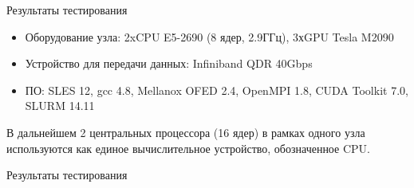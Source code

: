 \documentclass{beamer}
\begin{document}
\begin{frame}{Результаты тестирования}
	\begin{itemize}
		\item Оборудование узла: 2xCPU E5-2690 (8 ядер, 2.9ГГц), 3хGPU Tesla M2090 
		
		\vspace{0.7cm}		
		
		\item Устройство для передачи данных: Infiniband QDR 40Gbps

		\vspace{0.7cm}

		\item ПО: SLES 12, gcc 4.8,  Mellanox OFED 2.4, OpenMPI 1.8, CUDA Toolkit 7.0, SLURM 14.11 

	\end{itemize}
	
	\vspace{0.7cm}
	
В дальнейшем 2 центральных процессора (16 ядер) в рамках одного узла используются как единое вычислительное устройство, обозначенное CPU.
\end{frame}


\begin{frame}{Результаты тестирования}
\end{frame}
\end{document}
